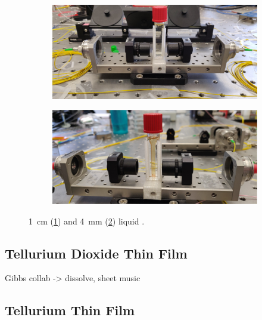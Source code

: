 \begin{figure}[t]
    \centering
    \begin{subfigure}[b]{0.49\textwidth}
        \centering
        \includegraphics[width=\textwidth]{figs/4-Raman/1cmCS2.jpeg}
        \caption{}
        \label{fig:Raman:1cmCS2}
    \end{subfigure}
    \hfill
    \begin{subfigure}[b]{0.49\textwidth}
        \centering
        \includegraphics[width=\textwidth]{figs/4-Raman/4mmCS2.jpg}
        \caption{}
        \label{fig:Raman:4mmCS2}
    \end{subfigure}
    \caption{\SI{1}{\centi\meter} (\ref{fig:Raman:1cmCS2}) and \SI{4}{\milli\meter} (\ref{fig:Raman:4mmCS2}) liquid .}
    \label{fig:Raman:CS2Cuvet}
\end{figure}

\subsection{Tellurium Dioxide Thin Film}
\label{subsec:Raman:Target:TeO2}

Gibbs collab -> dissolve, sheet music



\subsection{Tellurium Thin Film}
\label{subsec:Raman:Target:Te}

